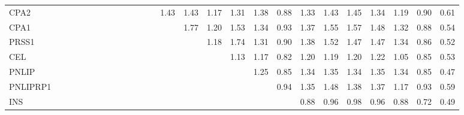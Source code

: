 \begin{longtable}{lrrrrrrrrrrrrrrrrrrrrrrrrr}
CPA2     &              &              &              &              &             &             &             &             &            &              &            &            &       1.43 &        1.43 &      1.17 &        1.31 &           1.38 &      0.88 &          1.33 &      1.43 &        1.45 &        1.34 &       1.19 &        0.90 &        0.61 \\
CPA1     &              &              &              &              &             &             &             &             &            &              &            &            &            &        1.77 &      1.20 &        1.53 &           1.34 &      0.93 &          1.37 &      1.55 &        1.57 &        1.48 &       1.32 &        0.88 &        0.54 \\
PRSS1    &              &              &              &              &             &             &             &             &            &              &            &            &            &             &      1.18 &        1.74 &           1.31 &      0.90 &          1.38 &      1.52 &        1.47 &        1.47 &       1.34 &        0.86 &        0.52 \\
CEL      &              &              &              &              &             &             &             &             &            &              &            &            &            &             &           &        1.13 &           1.17 &      0.82 &          1.20 &      1.19 &        1.20 &        1.22 &       1.05 &        0.85 &        0.53 \\
PNLIP    &              &              &              &              &             &             &             &             &            &              &            &            &            &             &           &             &           1.25 &      0.85 &          1.34 &      1.35 &        1.34 &        1.35 &       1.34 &        0.85 &        0.47 \\
PNLIPRP1 &              &              &              &              &             &             &             &             &            &              &            &            &            &             &           &             &                &      0.94 &          1.35 &      1.48 &        1.38 &        1.37 &       1.17 &        0.93 &        0.59 \\
INS      &              &              &              &              &             &             &             &             &            &              &            &            &            &             &           &             &                &           &          0.88 &      0.96 &        0.98 &        0.96 &       0.88 &        0.72 &        0.49 \\

\end{longtable}
